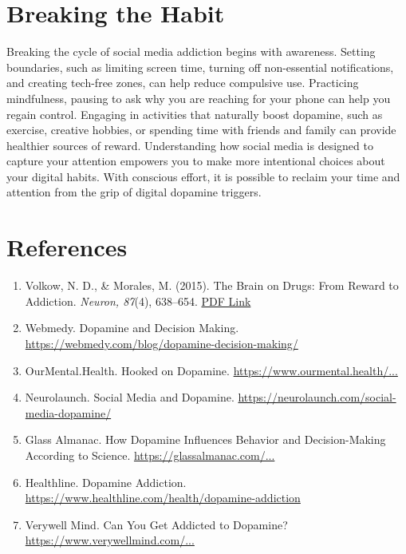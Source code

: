 \documentclass[a4paper,10pt,twocolumn]{memoir}
\begin{document}
\section*{Breaking the Habit}

Breaking the cycle of social media addiction begins with awareness. Setting boundaries, such as limiting screen time, turning off non-essential notifications, and creating tech-free zones, can help reduce compulsive use. Practicing mindfulness, pausing to ask why you are reaching for your phone can help you regain control. Engaging in activities that naturally boost dopamine, such as exercise, creative hobbies, or spending time with friends and family can provide healthier sources of reward. Understanding how social media is designed to capture your attention empowers you to make more intentional choices about your digital habits. With conscious effort, it is possible to reclaim your time and attention from the grip of digital dopamine triggers.

\section*{References}

\begin{enumerate}
    \item Volkow, N. D., \& Morales, M. (2015). The Brain on Drugs: From Reward to Addiction. \textit{Neuron, 87}(4), 638–654. \href{https://www.cell.com/neuron/pdf/S0896-6273(15)00133-6.pdf}{PDF Link}
    \item Webmedy. Dopamine and Decision Making. \href{https://webmedy.com/blog/dopamine-decision-making/}{https://webmedy.com/blog/dopamine-decision-making/}
    \item OurMental.Health. Hooked on Dopamine. \href{https://www.ourmental.health/screen-time-sanity/hooked-on-dopamine-how-social-media-hijacks-your-brain}{https://www.ourmental.health/...}
    \item Neurolaunch. Social Media and Dopamine. \href{https://neurolaunch.com/social-media-dopamine/}{https://neurolaunch.com/social-media-dopamine/}
    \item Glass Almanac. How Dopamine Influences Behavior and Decision-Making According to Science. \href{https://glassalmanac.com/how-dopamine-influences-behavior-and-decision-making-according-to-science/}{https://glassalmanac.com/...}
    \item Healthline. Dopamine Addiction. \href{https://www.healthline.com/health/dopamine-addiction}{https://www.healthline.com/health/dopamine-addiction}
    \item Verywell Mind. Can You Get Addicted to Dopamine? \href{https://www.verywellmind.com/can-you-get-addicted-to-dopamine-5207433}{https://www.verywellmind.com/...}
\end{enumerate} 
\end{document}
